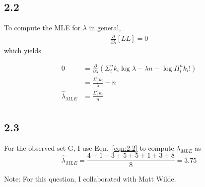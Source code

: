 \documentclass[12pt]{amsart}
\begin{document}
\subsection*{2.2}

To compute the MLE for $\lambda$ in general,
\begin{equation} 
\begin{split}
\frac{\partial}{\partial \lambda} \left[ LL \right] = 0
\end{split}
\end{equation}
which yields

\begin{equation} \label{eqn:2.2}
\begin{split}
0 & = \frac{\partial}{\partial \lambda} \left( \Sigma_i^n k_i \log \lambda - \lambda n - \log \Pi_i^n k_i ! \right) \\ 
& = \frac{\Sigma_i^n k_i}{\lambda} - n \\
\hat{\lambda}_{MLE} & = \frac{\Sigma_i^n k_i}{n} \\
\end{split}
\end{equation}

\subsection*{2.3}
For the observed set G, I use Eqn.~\ref{eqn:2.2} to compute $\lambda_{MLE}$ as
\begin{equation}
\hat{\lambda}_{MLE} = \frac{4+1+3+5+5+1+3+8}{8} = 3.75
\end{equation}

Note: For this question, I collaborated with Matt Wilde.
\end{document}
